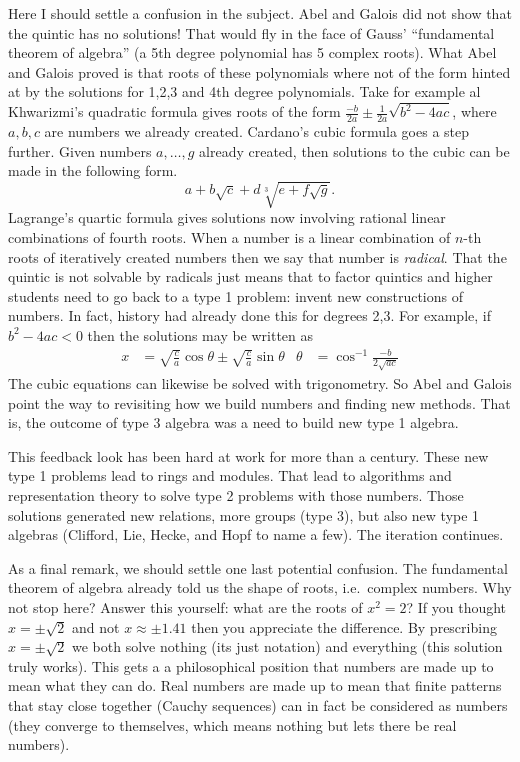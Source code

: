 Here I should settle a confusion in the subject.  Abel and Galois did 
not show that the quintic has no solutions!  That would fly in the 
face of  Gauss' ``fundamental theorem 
of algebra'' (a 5th degree polynomial has 5 complex roots).  
What Abel and Galois proved is that roots of these polynomials where not 
of the form hinted at by the solutions for 1,2,3 and 4th degree polynomials.
Take for example al Khwarizmi's quadratic formula gives roots of the form 
$\frac{-b}{2a}\pm \frac{1}{2a}\sqrt{b^2-4ac}$, where $a,b,c$ are numbers we 
already created.  Cardano's cubic formula goes a step further.  Given 
numbers $a,\ldots, g$ already created, then solutions to the cubic can 
be made in the following form.
\[
    a+b\sqrt{c}+d\sqrt[3]{e+f\sqrt{g}}.
\]
Lagrange's quartic formula gives solutions now involving rational 
linear combinations of fourth roots.  When a number is a linear combination 
of $n$-th roots of iteratively created numbers then we say that number 
is \emph{radical}.  That the quintic is not solvable by radicals just means 
that to factor quintics and higher students need to go back to a type 1 problem:
invent new constructions of numbers. In fact, history had already done this 
for degrees 2,3.  For example, if $b^2-4ac<0$ then the solutions may be written as
\begin{align*}
    x & = \sqrt{\frac{c}{a}}\cos\theta \pm \sqrt{\frac{c}{a}}\sin\theta
    & 
    \theta & = \cos^{-1}\frac{-b}{2\sqrt{ac}}
\end{align*}
The cubic equations can likewise be solved with trigonometry.  So Abel and Galois 
point the way to revisiting how we build numbers and finding new methods.  That is,
the outcome of type 3 algebra was a need to build new type 1 algebra.

This feedback look has been hard at work for more than a century.  These new
type 1 problems lead to rings and modules.  That lead to algorithms and
representation theory to solve type 2 problems with those numbers.  Those
solutions generated new relations, more groups (type 3), but also new type 1
algebras (Clifford, Lie, Hecke, and Hopf to name a few). The iteration continues. 

As a final remark, we should settle one last potential confusion.
The fundamental theorem of algebra already told us the shape of roots,
i.e.\ complex numbers.  Why not stop here?  Answer this yourself: 
what are the roots of  $x^2=2$?  If you thought $x=\pm\sqrt{2}$ and not $x\approx \pm 1.41$ then you 
appreciate the difference.  By prescribing $x=\pm \sqrt{2}$ we both solve nothing 
(its just notation) and everything (this solution truly works).  This gets a 
a philosophical position that numbers are made up to mean what they can do. 
Real numbers are made up to mean that finite patterns that stay close together 
(Cauchy sequences) can in fact be considered as numbers (they converge to themselves,
which means nothing but lets there be real numbers).

